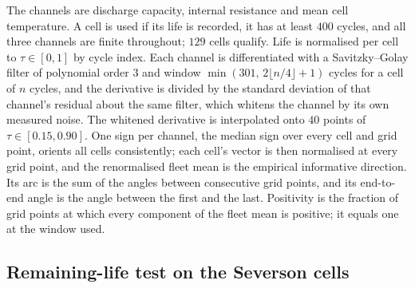 \documentclass[12pt]{article}
\begin{document}
The channels are discharge capacity, internal resistance and mean cell
temperature. A cell is used if its life is recorded, it has at least $400$
cycles, and all three channels are finite throughout; $129$ cells qualify.
Life is normalised per cell to $\tau\in[0,1]$ by cycle index. Each channel is
differentiated with a Savitzky--Golay filter of polynomial order $3$ and
window $\min(301,\,2\lfloor n/4\rfloor+1)$ cycles for a cell of $n$ cycles,
and the derivative is divided by the standard deviation of that channel's
residual about the same filter, which whitens the channel by its own measured
noise. The whitened derivative is interpolated onto $40$ points of
$\tau\in[0.15,0.90]$. One sign per channel, the median sign over every cell
and grid point, orients all cells consistently; each cell's vector is then
normalised at every grid point, and the renormalised fleet mean is the
empirical informative direction. Its arc is the sum of the angles between
consecutive grid points, and its end-to-end angle is the angle between the
first and the last. Positivity is the fraction of grid points at which every
component of the fleet mean is positive; it equals one at the window used.

\subsection{Remaining-life test on the Severson cells}
\end{document}
